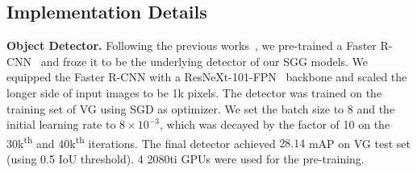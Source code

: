 \documentclass[10pt,twocolumn,letterpaper]{article}
\begin{document}
\vspace{-0.05in}
\subsection{Implementation Details}
\vspace{-0.05in}
\noindent\textbf{Object Detector.} Following the previous works~\cite{xu2017scene, zellers2018neural, tang2019learning}, we pre-trained a Faster R-CNN~\cite{ren2015faster} and froze it to be the underlying detector of our SGG models. We equipped the Faster R-CNN with a ResNeXt-101-FPN~\cite{lin2017feature, xie2017aggregated} backbone and scaled the longer side of input images to be 1k pixels. The detector was trained on the training set of VG using SGD as optimizer. We set the batch size to 8 and the initial learning rate to $8\times 10^{-3}$, which was decayed by the factor of 10 on the 30k\textsuperscript{th} and 40k\textsuperscript{th} iterations. The final detector achieved $28.14$ mAP on VG test set (using 0.5 IoU threshold). 4 2080ti GPUs were used for the pre-training. 
\end{document}
